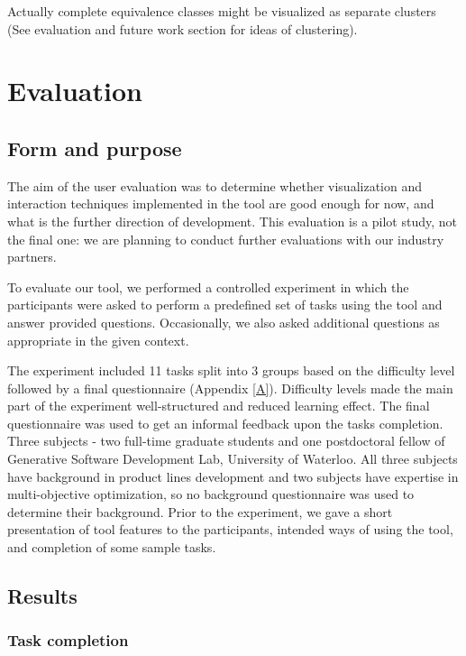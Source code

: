 \documentclass{acm_proc_article-sp}
\begin{document}
Actually complete equivalence classes might be visualized as separate clusters (See evaluation and future work section for ideas of clustering).

\section{Evaluation}

\subsection{Form and purpose}

The aim of the user evaluation was to determine whether visualization and interaction techniques implemented in the tool are good enough for now, and what is the further direction of development. This evaluation is a pilot study, not the final one: we are planning to conduct further evaluations with our industry partners.

To evaluate our tool, we performed a controlled experiment in which the participants were asked to perform a predefined set of tasks using the tool and answer provided questions. Occasionally, we also asked additional questions as appropriate in the given context.

The experiment included 11 tasks split into 3 groups based on the difficulty level followed by a final questionnaire (Appendix \ref{A}). Difficulty levels made the main part of the experiment well-structured and reduced learning effect. The final questionnaire was used to get an informal feedback upon the tasks completion. Three subjects - two full-time graduate students and one postdoctoral fellow of Generative Software Development Lab, University of Waterloo. All three subjects have background in product lines development and two subjects have expertise in multi-objective optimization, so no background questionnaire was used to determine their background. Prior to the experiment, we gave a short presentation of tool features to the participants, intended ways of using the tool, and completion of some sample tasks.

\subsection{Results}

\subsubsection{Task completion}
\end{document}
